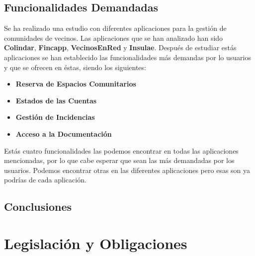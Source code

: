 \subsection{Funcionalidades Demandadas}
Se ha realizado una estudio con diferentes aplicaciones para la gestión de comunidades de vecinos. Las aplicaciones que se han analizado han sido \textbf{Colindar}, \textbf{Fincapp}, \textbf{VecinosEnRed} y \textbf{Insulae}. Después de estudiar estás aplicaciones se han establecido las funcionalidades más demandas por lo usuarios y que se ofrecen en éstas, siendo los siguientes:

\begin{itemize}
	\item \textbf{Reserva de Espacios Comunitarios}
	\item \textbf{Estados de las Cuentas}
	\item \textbf{Gestión de Incidencias}
	\item \textbf{Acceso a la Documentación}
\end{itemize}

Estás cuatro funcionalidades las podemos encontrar en todas las aplicaciones mencionadas, por lo que cabe esperar que sean las más demandadas por los usuarios. Podemos encontrar otras en las diferentes aplicaciones pero esas son ya podrías de cada aplicación.

\subsection{Conclusiones}
 

\section{Legislación y Obligaciones}




%

